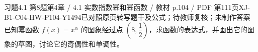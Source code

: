 \par\noindent\begin{minipage}{\linewidth}
\begin{bankitem}{习题4.1 第8题}{第4章 / 4.1 实数指数幂和幂函数 / 教材 p.104 / PDF 第111页}{XJ-B1-C04-HW-P104-Y1494}{已对照原页转写题干及公式；待教师复核；未制作答案}
已知幂函数 $f(x)=x^\alpha$ 的图象经过点 $\left(8,\dfrac12\right)$，求函数的表达式，并画出它的图象的草图，讨论它的奇偶性和单调性。
\end{bankitem}
\end{minipage}\par\medskip
